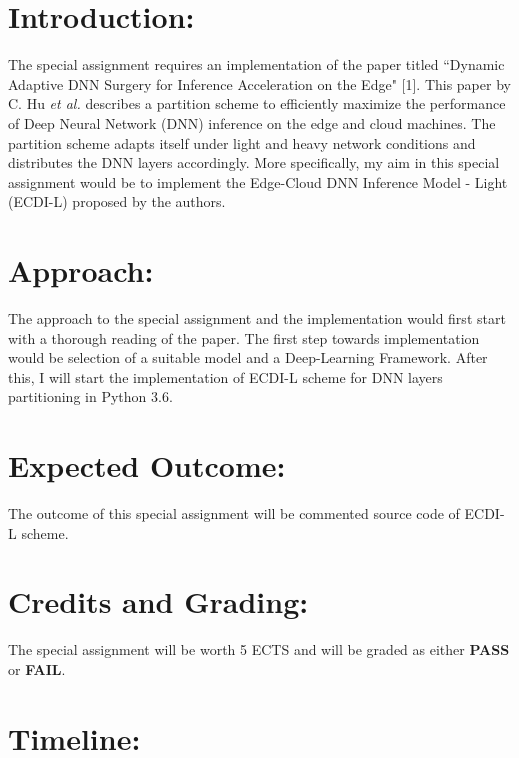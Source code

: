 \documentclass{article}
\begin{document}
    \begin{normalsize}
    
    	\section{Introduction:}
         The special assignment requires an implementation of the paper titled ``Dynamic Adaptive DNN Surgery for Inference Acceleration on the Edge" [1]. This paper by C. Hu \textit{et al.} describes a partition scheme to efficiently maximize the performance of Deep Neural Network (DNN) inference on the edge and cloud machines. The partition scheme adapts itself under light and heavy network conditions and distributes the DNN layers accordingly. More specifically, my aim in this special assignment would be to implement the Edge-Cloud DNN Inference Model - Light (ECDI-L) proposed by the authors.       

        
	   	\section{Approach:}
        
      	The approach to the special assignment and the implementation would first start with a thorough reading of the paper. The first step towards implementation would be selection of a suitable model and a Deep-Learning Framework. After this, I will start the implementation of ECDI-L scheme for DNN layers partitioning in Python 3.6. 
      	
      	\section{Expected Outcome:}
      	
      	The outcome of this special assignment will be  commented source code of ECDI-L scheme. 
      	
      	\section{Credits and Grading:}
      	
      	The special assignment will be worth 5 ECTS and will be graded as either \textbf{PASS}  or \textbf{FAIL}.      	
      	
        
    	\section{Timeline:}
        

\end{normalsize}
\end{document}
